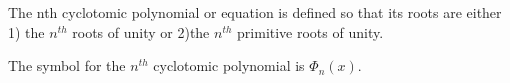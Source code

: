 The nth cyclotomic polynomial or equation is defined so that its roots
are either 1) the $n^{th}$  roots of unity or 
2)the $n^{th}$  primitive roots of unity.
\par
The symbol for the $n^{th}$  cyclotomic polynomial is
$ \Phi _n (x) . $